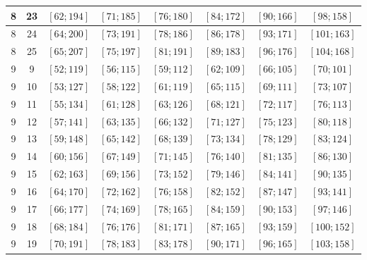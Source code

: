\documentclass[a4paper,12pt]{article}
\begin{document}
\begin{center}
{\begin{longtable}[H]{|c|c|c|c|c|c|c|c|}
8 &  23 &  $\left[ 62; 194\right]$ &  $\left[ 71; 185\right]$ &  $\left[ 76; 180\right]$ &  $\left[ 84; 172\right]$ &  $\left[ 90; 166\right]$ &  $\left[ 98; 158\right]$ \tabularnewline \hline
8 &  24 &  $\left[ 64; 200\right]$ &  $\left[ 73; 191\right]$ &  $\left[ 78; 186\right]$ &  $\left[ 86; 178\right]$ &  $\left[ 93; 171\right]$ &  $\left[ 101; 163\right]$ \tabularnewline \hline
8 &  25 &  $\left[ 65; 207\right]$ &  $\left[ 75; 197\right]$ &  $\left[ 81; 191\right]$ &  $\left[ 89; 183\right]$ &  $\left[ 96; 176\right]$ &  $\left[ 104; 168\right]$ \tabularnewline \hline
9 &  9 &  $\left[ 52; 119\right]$ &  $\left[ 56; 115\right]$ &  $\left[ 59; 112\right]$ &  $\left[ 62; 109\right]$ &  $\left[ 66; 105\right]$ &  $\left[ 70; 101\right]$ \tabularnewline \hline
9 &  10 &  $\left[ 53; 127\right]$ &  $\left[ 58; 122\right]$ &  $\left[ 61; 119\right]$ &  $\left[ 65; 115\right]$ &  $\left[ 69; 111\right]$ &  $\left[ 73; 107\right]$ \tabularnewline \hline
9 &  11 &  $\left[ 55; 134\right]$ &  $\left[ 61; 128\right]$ &  $\left[ 63; 126\right]$ &  $\left[ 68; 121\right]$ &  $\left[ 72; 117\right]$ &  $\left[ 76; 113\right]$ \tabularnewline \hline
9 &  12 &  $\left[ 57; 141\right]$ &  $\left[ 63; 135\right]$ &  $\left[ 66; 132\right]$ &  $\left[ 71; 127\right]$ &  $\left[ 75; 123\right]$ &  $\left[ 80; 118\right]$ \tabularnewline \hline
9 &  13 &  $\left[ 59; 148\right]$ &  $\left[ 65; 142\right]$ &  $\left[ 68; 139\right]$ &  $\left[ 73; 134\right]$ &  $\left[ 78; 129\right]$ &  $\left[ 83; 124\right]$ \tabularnewline \hline
9 &  14 &  $\left[ 60; 156\right]$ &  $\left[ 67; 149\right]$ &  $\left[ 71; 145\right]$ &  $\left[ 76; 140\right]$ &  $\left[ 81; 135\right]$ &  $\left[ 86; 130\right]$ \tabularnewline \hline
9 &  15 &  $\left[ 62; 163\right]$ &  $\left[ 69; 156\right]$ &  $\left[ 73; 152\right]$ &  $\left[ 79; 146\right]$ &  $\left[ 84; 141\right]$ &  $\left[ 90; 135\right]$ \tabularnewline \hline
9 &  16 &  $\left[ 64; 170\right]$ &  $\left[ 72; 162\right]$ &  $\left[ 76; 158\right]$ &  $\left[ 82; 152\right]$ &  $\left[ 87; 147\right]$ &  $\left[ 93; 141\right]$ \tabularnewline \hline
9 &  17 &  $\left[ 66; 177\right]$ &  $\left[ 74; 169\right]$ &  $\left[ 78; 165\right]$ &  $\left[ 84; 159\right]$ &  $\left[ 90; 153\right]$ &  $\left[ 97; 146\right]$ \tabularnewline \hline
9 &  18 &  $\left[ 68; 184\right]$ &  $\left[ 76; 176\right]$ &  $\left[ 81; 171\right]$ &  $\left[ 87; 165\right]$ &  $\left[ 93; 159\right]$ &  $\left[ 100; 152\right]$ \tabularnewline \hline
9 &  19 &  $\left[ 70; 191\right]$ &  $\left[ 78; 183\right]$ &  $\left[ 83; 178\right]$ &  $\left[ 90; 171\right]$ &  $\left[ 96; 165\right]$ &  $\left[ 103; 158\right]$ \tabularnewline \hline

\end{longtable}}
\end{center}
\end{document}
